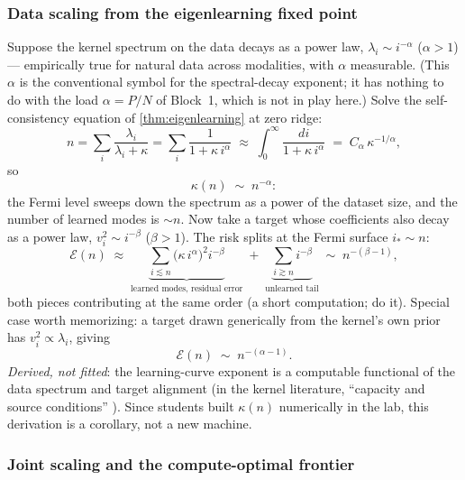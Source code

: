 \documentclass[11pt]{article}
\begin{document}
\subsubsection{Data scaling from the eigenlearning fixed point}

Suppose the kernel spectrum on the data decays as a power law,
$\lambda_i \sim i^{-\alpha}$ ($\alpha > 1$) --- empirically true for natural
data across modalities, with $\alpha$ measurable. (This $\alpha$ is the
conventional symbol for the spectral-decay exponent; it has nothing to do
with the load $\alpha = P/N$ of Block~1, which is not in play here.) Solve the
self-consistency equation of \cref{thm:eigenlearning} at zero ridge:
\begin{equation}
  n = \sum_i \frac{\lambda_i}{\lambda_i + \kappa}
  = \sum_i \frac{1}{1 + \kappa\, i^{\alpha}}
  \;\approx\; \int_0^\infty \frac{di}{1 + \kappa\, i^{\alpha}}
  \;=\; C_\alpha\, \kappa^{-1/\alpha},
\end{equation}
so
\begin{equation}
  \kappa(n) \;\sim\; n^{-\alpha}:
\end{equation}
the Fermi level sweeps down the spectrum as a power of the dataset size, and
the number of learned modes is $\sim n$. Now take a target whose
coefficients also decay as a power law, $v_i^2 \sim i^{-\beta}$
($\beta > 1$). The risk splits at the Fermi surface $i_* \sim n$:
\begin{equation}
  \mathcal{E}(n) \;\approx\;
  \underbrace{\sum_{i \lesssim n} \bigl(\kappa\, i^{\alpha}\bigr)^2 i^{-\beta}}_{\text{learned modes, residual error}}
  \;+\;
  \underbrace{\sum_{i \gtrsim n} i^{-\beta}}_{\text{unlearned tail}}
  \;\sim\; n^{-(\beta - 1)},
\end{equation}
both pieces contributing at the same order (a short computation; do it).
Special case worth memorizing: a target drawn generically from the kernel's
own prior has $v_i^2 \propto \lambda_i$, giving
\begin{equation}
  \label{eq:data-scaling}
  \mathcal{E}(n) \;\sim\; n^{-(\alpha - 1)} .
\end{equation}
\emph{Derived, not fitted}: the learning-curve exponent is a computable
functional of the data spectrum and target alignment (in the kernel
literature, ``capacity and source conditions''
\cite{bordelon2020spectrum,cui2023error}). Since students built $\kappa(n)$
numerically in the lab, this derivation is a corollary, not a new
machine.

\subsubsection{Joint scaling and the compute-optimal frontier}
\end{document}
